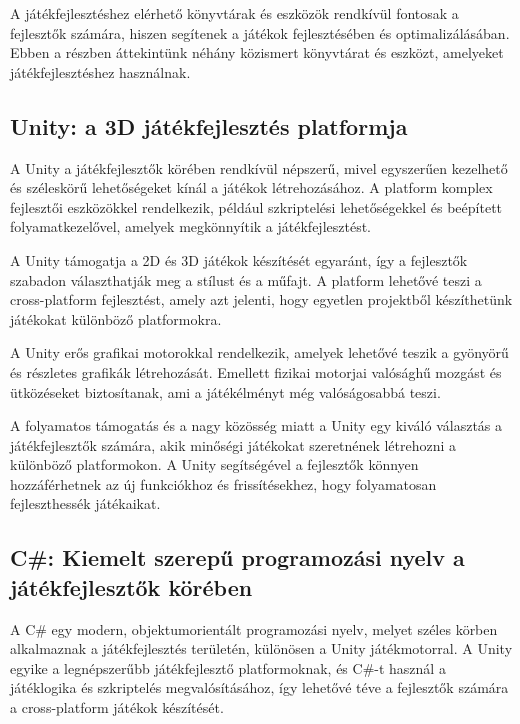  A játékfejlesztéshez elérhető könyvtárak és eszközök rendkívül fontosak a fejlesztők számára, hiszen segítenek a játékok fejlesztésében és optimalizálásában. Ebben a részben áttekintünk néhány közismert könyvtárat és eszközt, amelyeket játékfejlesztéshez használnak.

\bigskip

\subsection{Unity: a 3D játékfejlesztés platformja}

A Unity \cite{unity-docs, unity-web} a játékfejlesztők körében rendkívül népszerű, mivel egyszerűen kezelhető és széleskörű lehetőségeket kínál a játékok létrehozásához. A platform komplex fejlesztői eszközökkel rendelkezik, például szkriptelési lehetőségekkel és beépített folyamatkezelővel, amelyek megkönnyítik a játékfejlesztést. 

A Unity támogatja a 2D és 3D játékok készítését egyaránt, így a fejlesztők szabadon választhatják meg a stílust és a műfajt. A platform lehetővé teszi a cross-platform fejlesztést, amely azt jelenti, hogy egyetlen projektből készíthetünk játékokat különböző platformokra.

A Unity erős grafikai motorokkal rendelkezik, amelyek lehetővé teszik a gyönyörű és részletes grafikák létrehozását. Emellett fizikai motorjai valósághű mozgást és ütközéseket biztosítanak, ami a játékélményt még valóságosabbá teszi.

A folyamatos támogatás és a nagy közösség miatt a Unity egy kiváló választás a játékfejlesztők számára, akik minőségi játékokat szeretnének létrehozni a különböző platformokon. A Unity segítségével a fejlesztők könnyen hozzáférhetnek az új funkciókhoz és frissítésekhez, hogy folyamatosan fejleszthessék játékaikat.

\subsection{C\#: Kiemelt szerepű programozási nyelv a játékfejlesztők körében}

 A C\# \cite{csharp-doc} egy modern, objektumorientált programozási nyelv, melyet széles körben alkalmaznak a játékfejlesztés területén, különösen a Unity játékmotorral\cite{unity-cs}. A Unity egyike a legnépszerűbb játékfejlesztő platformoknak, és C\#-t használ a játéklogika és szkriptelés megvalósításához, így lehetővé téve a fejlesztők számára a cross-platform játékok készítését.

